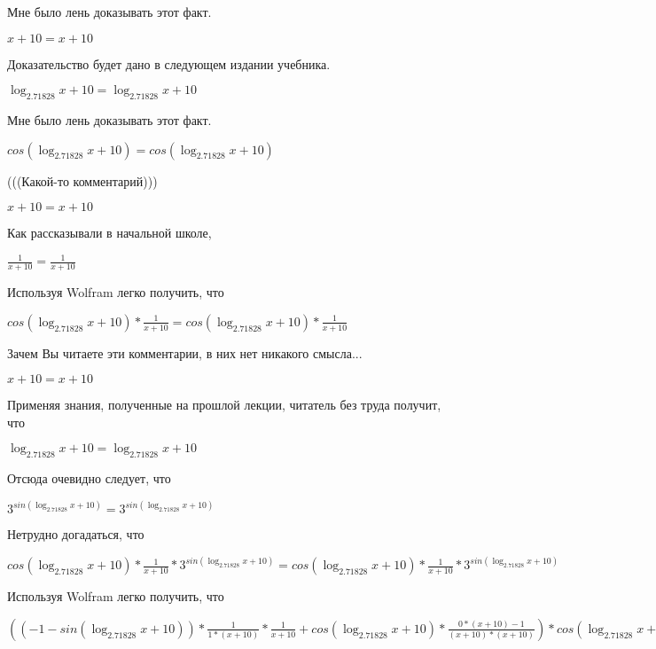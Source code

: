 \documentclass[12pt,a4paper,fleqn]{article}
\theoremstyle{definition}
\begin{document}
Мне было лень доказывать этот факт.

$ x  +  10  =  x  +  10 $

Доказательство будет дано в следующем издании учебника. 

$\log_{ 2.71828 }{ x  +  10 } = \log_{ 2.71828 }{ x  +  10 }$

Мне было лень доказывать этот факт.

$cos(\log_{ 2.71828 }{ x  +  10 }) = cos(\log_{ 2.71828 }{ x  +  10 })$

(((Какой-то комментарий))) 

$ x  +  10  =  x  +  10 $

Как рассказывали в начальной школе, 

$\frac{ 1 }{ x  +  10 }
 = \frac{ 1 }{ x  +  10 }
$

Используя Wolfram легко получить, что 

$cos(\log_{ 2.71828 }{ x  +  10 }) * \frac{ 1 }{ x  +  10 }
 = cos(\log_{ 2.71828 }{ x  +  10 }) * \frac{ 1 }{ x  +  10 }
$

Зачем Вы читаете эти комментарии, в них нет никакого смысла... 

$ x  +  10  =  x  +  10 $

Применяя знания, полученные на прошлой лекции, читатель без труда получит, что 

$\log_{ 2.71828 }{ x  +  10 } = \log_{ 2.71828 }{ x  +  10 }$

Отсюда очевидно следует, что 

${ 3 }^{sin(\log_{ 2.71828 }{ x  +  10 })} = { 3 }^{sin(\log_{ 2.71828 }{ x  +  10 })}$

Нетрудно догадаться, что 

$cos(\log_{ 2.71828 }{ x  +  10 }) * \frac{ 1 }{ x  +  10 }
 * { 3 }^{sin(\log_{ 2.71828 }{ x  +  10 })} = cos(\log_{ 2.71828 }{ x  +  10 }) * \frac{ 1 }{ x  +  10 }
 * { 3 }^{sin(\log_{ 2.71828 }{ x  +  10 })}$

Используя Wolfram легко получить, что 

$(( -1  - sin(\log_{ 2.71828 }{ x  +  10 })) * \frac{ 1 }{ 1  * ( x  +  10 )}
 * \frac{ 1 }{ x  +  10 }
 + cos(\log_{ 2.71828 }{ x  +  10 }) * \frac{ 0  * ( x  +  10 ) -  1 }{( x  +  10 ) * ( x  +  10 )}
) * cos(\log_{ 2.71828 }{ x  +  10 }) * \frac{ 1 }{ x  +  10 }
 * { 3 }^{sin(\log_{ 2.71828 }{ x  +  10 })} = (( -1  - sin(\log_{ 2.71828 }{ x  +  10 })) * \frac{ 1 }{ 1  * ( x  +  10 )}
 * \frac{ 1 }{ x  +  10 }
 + cos(\log_{ 2.71828 }{ x  +  10 }) * \frac{ 0  * ( x  +  10 ) -  1 }{( x  +  10 ) * ( x  +  10 )}
) * cos(\log_{ 2.71828 }{ x  +  10 }) * \frac{ 1 }{ x  +  10 }
 * { 3 }^{sin(\log_{ 2.71828 }{ x  +  10 })}$
\end{document}
